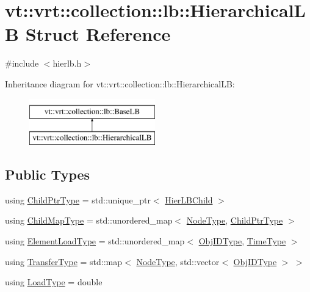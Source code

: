 \hypertarget{structvt_1_1vrt_1_1collection_1_1lb_1_1_hierarchical_l_b}{}\section{vt\+:\+:vrt\+:\+:collection\+:\+:lb\+:\+:Hierarchical\+LB Struct Reference}
\label{structvt_1_1vrt_1_1collection_1_1lb_1_1_hierarchical_l_b}


{\ttfamily \#include $<$hierlb.\+h$>$}

Inheritance diagram for vt\+:\+:vrt\+:\+:collection\+:\+:lb\+:\+:Hierarchical\+LB\+:\begin{figure}[H]
\begin{center}
\leavevmode
\includegraphics[height=2.000000cm]{structvt_1_1vrt_1_1collection_1_1lb_1_1_hierarchical_l_b}
\end{center}
\end{figure}
\subsection*{Public Types}
\begin{DoxyCompactItemize}
\item 
using \hyperlink{structvt_1_1vrt_1_1collection_1_1lb_1_1_hierarchical_l_b_a4dd8525145427a29350a287a777655de}{Child\+Ptr\+Type} = std\+::unique\+\_\+ptr$<$ \hyperlink{structvt_1_1vrt_1_1collection_1_1lb_1_1_hier_l_b_child}{Hier\+L\+B\+Child} $>$
\item 
using \hyperlink{structvt_1_1vrt_1_1collection_1_1lb_1_1_hierarchical_l_b_a95e5a93033703216cad8ec7a3da7a2ef}{Child\+Map\+Type} = std\+::unordered\+\_\+map$<$ \hyperlink{namespacevt_a866da9d0efc19c0a1ce79e9e492f47e2}{Node\+Type}, \hyperlink{structvt_1_1vrt_1_1collection_1_1lb_1_1_hierarchical_l_b_a4dd8525145427a29350a287a777655de}{Child\+Ptr\+Type} $>$
\item 
using \hyperlink{structvt_1_1vrt_1_1collection_1_1lb_1_1_hierarchical_l_b_ae63d1ddb968e51d0c57b546bdc1d08c7}{Element\+Load\+Type} = std\+::unordered\+\_\+map$<$ \hyperlink{structvt_1_1vrt_1_1collection_1_1lb_1_1_base_l_b_a15a2f756b59c8c2437985206b32aa403}{Obj\+I\+D\+Type}, \hyperlink{namespacevt_a876a9d0cd5a952859c72de8a46881442}{Time\+Type} $>$
\item 
using \hyperlink{structvt_1_1vrt_1_1collection_1_1lb_1_1_hierarchical_l_b_a83550b541c35c8a1cc0c97779d1c8184}{Transfer\+Type} = std\+::map$<$ \hyperlink{namespacevt_a866da9d0efc19c0a1ce79e9e492f47e2}{Node\+Type}, std\+::vector$<$ \hyperlink{structvt_1_1vrt_1_1collection_1_1lb_1_1_base_l_b_a15a2f756b59c8c2437985206b32aa403}{Obj\+I\+D\+Type} $>$ $>$
\item 
using \hyperlink{structvt_1_1vrt_1_1collection_1_1lb_1_1_hierarchical_l_b_aac9e2507c1e3c0a3321567ff02aebe6f}{Load\+Type} = double
\end{DoxyCompactItemize}
